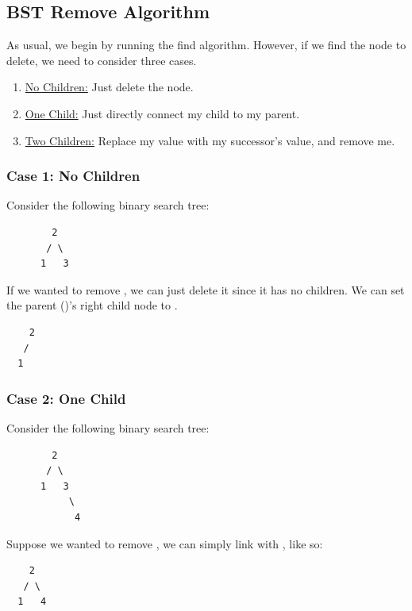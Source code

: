\documentclass[letterpaper]{article}
\begin{document}
\subsection{BST Remove Algorithm}
As usual, we begin by running the find algorithm. However, if we find the node to delete, we need to consider three cases. 

\begin{enumerate}
    \item \underline{No Children:} Just delete the node. 
    \item \underline{One Child:} Just directly connect my child to my parent. 
    \item \underline{Two Children:} Replace my value with my successor's value, and remove me. 
\end{enumerate}

\subsubsection{Case 1: No Children}
Consider the following binary search tree: 
\begin{verbatim}
        2
       / \ 
      1   3
\end{verbatim}
If we wanted to remove , we can just delete it since it has no children. We can set the parent ()'s right child node to .
\begin{verbatim}
    2
   /  
  1   
\end{verbatim}

\subsubsection{Case 2: One Child}
Consider the following binary search tree: 
\begin{verbatim}
        2
       / \ 
      1   3 
           \ 
            4
\end{verbatim}
Suppose we wanted to remove , we can simply link  with , like so: 
\begin{verbatim}
    2
   / \ 
  1   4 
\end{verbatim}
\end{document}
